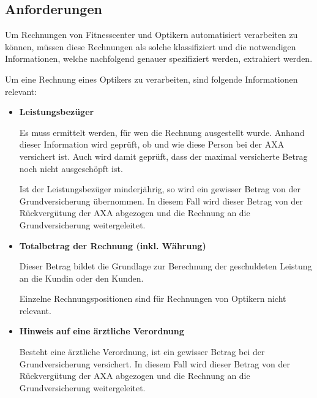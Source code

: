 \subsection{Anforderungen}
\label{chap:requirements}

Um Rechnungen von Fitnesscenter und Optikern automatisiert verarbeiten zu können, müssen diese Rechnungen als solche klassifiziert und die notwendigen Informationen, welche nachfolgend genauer spezifiziert werden, extrahiert werden.

Um eine Rechnung eines Optikers zu verarbeiten, sind folgende Informationen relevant:

\nopagebreak
\begin{itemize}
    \item \textbf{Leistungsbezüger}
    
    Es muss ermittelt werden, für wen die Rechnung ausgestellt wurde. Anhand dieser Information wird geprüft, ob und wie diese Person bei der AXA versichert ist. Auch wird damit geprüft, dass der maximal versicherte Betrag noch nicht ausgeschöpft ist.
    
    Ist der Leistungsbezüger minderjährig, so wird ein gewisser Betrag von der Grundversicherung übernommen. In diesem Fall wird dieser Betrag von der Rückvergütung der AXA abgezogen und die Rechnung an die Grundversicherung weitergeleitet.
    
    \item \textbf{Totalbetrag der Rechnung (inkl. Währung)}
    
    Dieser Betrag bildet die Grundlage zur Berechnung der geschuldeten Leistung an die Kundin oder den Kunden. 
    
    Einzelne Rechnungspositionen sind für Rechnungen von Optikern nicht relevant.
    
    \item \textbf{Hinweis auf eine ärztliche Verordnung}
    
    Besteht eine ärztliche Verordnung, ist ein gewisser Betrag bei der Grundversicherung versichert. In diesem Fall wird dieser Betrag von der Rückvergütung der AXA abgezogen und die Rechnung an die Grundversicherung weitergeleitet.
\end{itemize}


